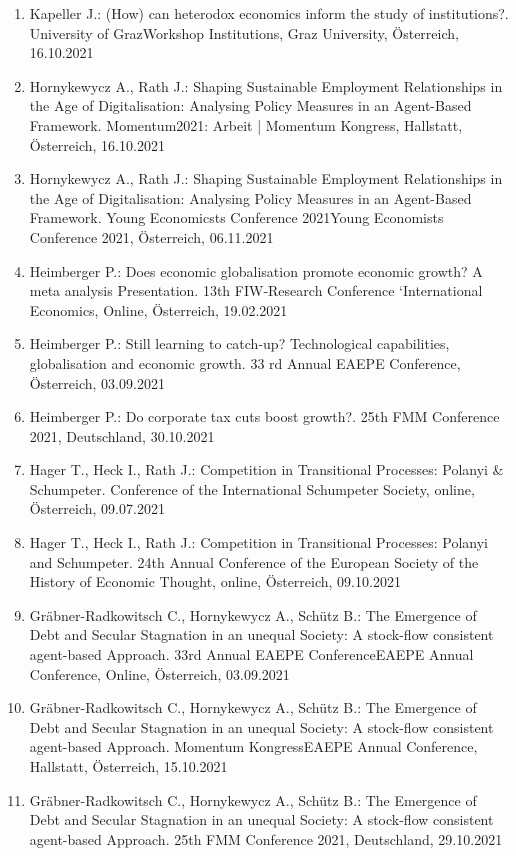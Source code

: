 \begin{enumerate}
	\item Kapeller J.: (How) can heterodox economics inform the study of institutions?. University of GrazWorkshop \glqq Institutions\grqq{}, Graz University, Österreich, 16.10.2021
	\item Hornykewycz A., Rath J.: Shaping Sustainable Employment Relationships in the Age of Digitalisation: Analysing Policy Measures in an Agent-Based Framework. Momentum2021: Arbeit | Momentum Kongress, Hallstatt, Österreich, 16.10.2021
	\item Hornykewycz A., Rath J.: Shaping Sustainable Employment Relationships in the Age of Digitalisation: Analysing Policy Measures in an Agent-Based Framework. Young Economicsts Conference 2021Young Economists Conference 2021, Österreich, 06.11.2021
	\item Heimberger P.: Does economic globalisation promote economic growth? A meta analysis Presentation. 13th FIW-Research Conference ‘International Economics, Online, Österreich, 19.02.2021
	\item Heimberger P.: Still learning to catch-up? Technological capabilities, globalisation and economic growth. 33 rd Annual EAEPE Conference, Österreich, 03.09.2021
	\item Heimberger P.: Do corporate tax cuts boost growth?. 25th FMM Conference 2021, Deutschland, 30.10.2021
	\item Hager T., Heck I., Rath J.: Competition in Transitional Processes: Polanyi \& Schumpeter. Conference of the International Schumpeter Society, online, Österreich, 09.07.2021
	\item Hager T., Heck I., Rath J.: Competition in Transitional Processes: Polanyi and Schumpeter. 24th Annual Conference of the European Society of the History of Economic Thought, online, Österreich, 09.10.2021
	\item Gräbner-Radkowitsch C., Hornykewycz A., Schütz B.: The Emergence of Debt and Secular Stagnation in an unequal Society: A stock-flow consistent agent-based Approach. 33rd Annual EAEPE ConferenceEAEPE Annual Conference, Online, Österreich, 03.09.2021
	\item Gräbner-Radkowitsch C., Hornykewycz A., Schütz B.: The Emergence of Debt and Secular Stagnation in an unequal Society: A stock-flow consistent agent-based Approach. Momentum KongressEAEPE Annual Conference, Hallstatt, Österreich, 15.10.2021
	\item Gräbner-Radkowitsch C., Hornykewycz A., Schütz B.: The Emergence of Debt and Secular Stagnation in an unequal Society: A stock-flow consistent agent-based Approach. 25th FMM Conference 2021, Deutschland, 29.10.2021

\end{enumerate}
